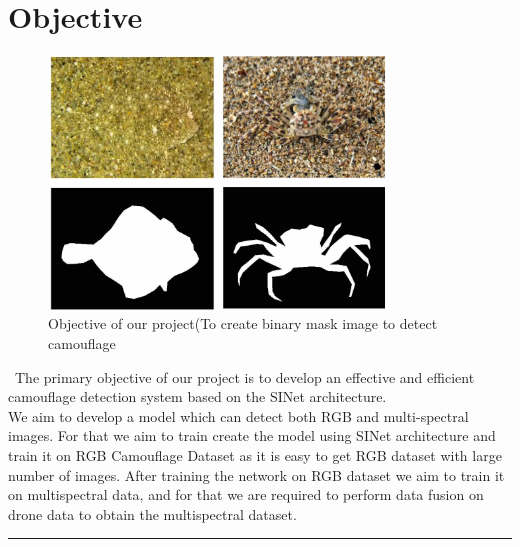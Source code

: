 \section{{{\fontsize{17}{21}\selectfont \textbf{Objective}}}}
\setlength{\columnsep}{1.5cm}
\begin{figure}[h]
  \centering
  \includegraphics[width=0.8\textwidth]{sections/LBP/camouflaged_object_zIElgp0.jpg}
  \caption{Objective of our project(To create binary mask image to detect camouflage}
  \label{fig:figure_label}
\end{figure}

\begin{multicols}{2}
\ The primary objective of our project is to develop an effective and efficient camouflage detection system based on the SINet architecture. \\
We aim to develop a model which can detect both RGB and multi-spectral images. For that we aim to train create the model using SINet architecture and train it on RGB Camouflage Dataset as it is easy to get RGB dataset with large number of images. After training the network on RGB dataset we aim to train it on multispectral data, and for that we are required to perform data fusion on drone data to obtain the multispectral dataset.
\end{multicols}

\vspace{0.5cm}
{\color{gray}\hrule}
\vspace{0.5cm}